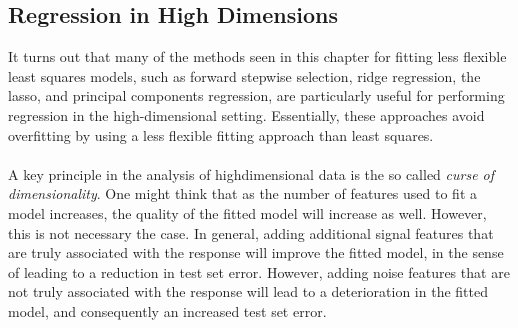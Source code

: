 \subsection{Regression in High Dimensions}
It turns out that many of the methods seen in this chapter for fitting
less flexible least squares models, such as forward stepwise selection, ridge regression, the lasso, and principal components regression, are particularly useful for performing regression in the high-dimensional setting. Essentially, these approaches avoid overfitting by using a less flexible fitting approach than least squares.\\\\
A key principle in the analysis of highdimensional data is the so called \textit{curse of dimensionality}. One might think that as the number of features used to fit a model increases, the quality of the fitted model will increase as well. However, this is not necessary the case. In general, adding additional signal features that are truly associated with the response will improve the fitted model, in the sense of leading to a reduction in test set error. However, adding
noise features that are not truly associated with the response will lead to a deterioration in the fitted model, and consequently an increased test set error. 
